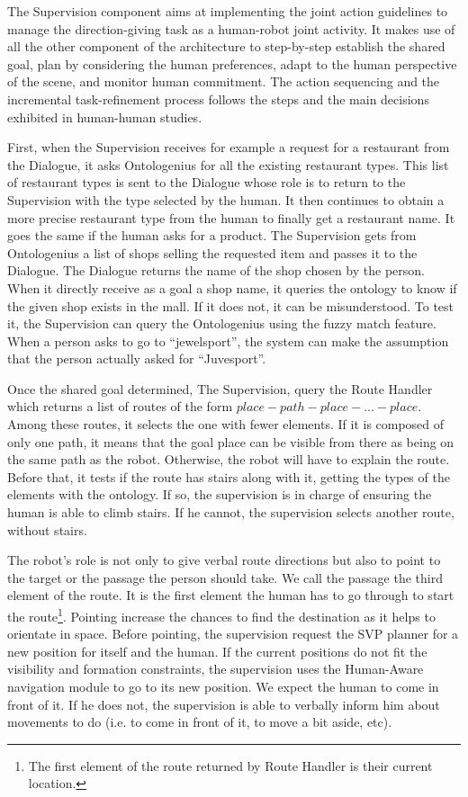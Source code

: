 The Supervision component aims at implementing the joint action guidelines to manage the direction-giving task as a human-robot joint activity. It makes use of all the other component of the architecture to step-by-step establish the shared goal, plan by considering the human preferences, adapt to the human perspective of the scene, and monitor human commitment. The action sequencing and the incremental task-refinement process follows the steps and the main decisions exhibited in human-human studies. 

First, when the Supervision receives for example a request for a restaurant from the Dialogue, it asks Ontologenius for all the existing restaurant types. This list of restaurant types is sent to the Dialogue whose role is to return to the Supervision with the type selected by the human. It then continues to obtain a more precise restaurant type from the human to finally get a restaurant name. It goes the same if the human asks for a product. The Supervision gets from Ontologenius a list of shops selling the requested item and passes it to the Dialogue. The Dialogue returns the name of the shop chosen by the person. When it directly receive as a goal a shop name, it queries the ontology to know if the given shop exists in the mall. If it does not, it can be misunderstood. To test it, the Supervision can query the Ontologenius using the fuzzy match feature. When a person asks to go to ``jewelsport'', the system can make the assumption that the person actually asked for ``Juvesport''.

Once the shared goal determined, The Supervision, query the Route Handler which returns a list of routes of the form $place - path - place - ... - place$. Among these routes, it selects the one with fewer elements. If it is composed of only one path, it means that the goal place can be visible from there as being on the same path as the robot. Otherwise, the robot will have to explain the route. Before that, it tests if the route has stairs along with it, getting the types of the elements with the ontology. If so, the supervision is in charge of ensuring the human is able to climb stairs. If he cannot, the supervision selects another route, without stairs.

The robot's role is not only to give verbal route directions but also to point to the target or the passage the person should take. We call the passage the third element of the route. It is the first element the human has to go through to start the route\footnote{The first element of the route returned by Route Handler is their current location.}. Pointing increase the chances to find the destination as it helps to orientate in space. Before pointing, the supervision request the SVP planner for a new position for itself and the human. If the current positions do not fit the visibility and formation constraints, the supervision uses the Human-Aware navigation module to go to its new position. We expect the human to come in front of it. If he does not, the supervision is able to verbally inform him about movements to do (i.e. to come in front of it, to move a bit aside, etc).

